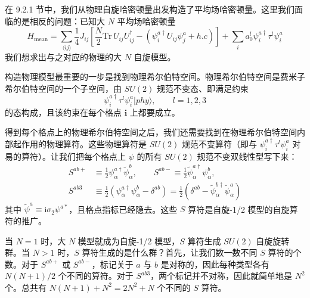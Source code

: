 在 9.2.1 节中，我们从物理自旋哈密顿量出发构造了平均场哈密顿量。这里我们面临的是相反的问题：已知大 $N$ 平均场哈密顿量
\begin{equation*}
H_{\text{mean}}=\sum_{\langle ij\rangle}\frac{1}{4}J_{ij}\left[\frac{N}{2}\mathrm{Tr}\,U_{ij}U_{ij}^{\dagger}-(\psi_i^{a\dagger}U_{ij}\psi_j^{a}+h.c)\right]+\sum_i a_0^l\psi_i^{a\dagger}\tau^{l}\psi_i^{a}
\tag{9.8.3}
\end{equation*}
我们想求出与之对应的物理的大 $N$ 自旋模型。

构造物理模型最重要的一步是找到物理希尔伯特空间。物理希尔伯特空间是费米子希尔伯特空间的一个子空间，由 $SU(2)$ 规范不变态、即满足约束
\begin{equation*}
\psi_i^{a\dagger}\tau^{l}\psi_i^{a}|phy\rangle,\qquad l=1,2,3
\end{equation*}
的态构成，且该约束在每个格点 $\pmb{i}$ 上都要成立。

得到每个格点上的物理希尔伯特空间之后，我们还需要找到在物理希尔伯特空间内部起作用的物理算符。这些物理算符是 $SU(2)$ 规范不变算符（即与 $\psi_i^{a\dagger}\tau^{l}\psi_i^{a}$ 对易的算符）。让我们把每个格点上 $\psi$ 的所有 $SU(2)$ 规范不变双线性型写下来：
\begin{equation*}
\begin{aligned}
S^{ab+}&\equiv\frac{1}{2}\psi_\alpha^{a\dagger}\tilde\psi_\alpha^{b},\qquad
S^{ab-}\equiv\frac{1}{2}\tilde\psi_\alpha^{a\dagger}\psi_\alpha^{b},\\
S^{ab3}&\equiv\frac{1}{2}\left(\psi_\alpha^{a\dagger}\psi_\alpha^{b}-\delta^{ab}\right)
=\frac{1}{2}\left(\delta^{ab}-\tilde\psi_\alpha^{b\dagger}\tilde\psi_\alpha^{a}\right)
\end{aligned}
\end{equation*}
其中 $\tilde\psi^{a}\equiv\mathrm{i}\sigma_2\psi^{a*}$，且格点指标已经隐去。这些 $S$ 算符是自旋-1/2 模型的自旋算符的推广。

当 $N=1$ 时，大 $N$ 模型就成为自旋-1/2 模型，$S$ 算符生成 $SU(2)$ 自旋旋转群。当 $N>1$ 时，$S$ 算符生成的是什么群？首先，让我们数一数不同 $S$ 算符的个数。对于 $S^{ab+}$ 或 $S^{ab-}$，标记关于 $a$ 与 $b$ 是对称的，因此每种类型各有 $N(N+1)/2$ 个不同的算符。对于 $S^{ab3}$，两个标记并不对称，因此就简单地是 $N^{2}$ 个。总共有 $N(N+1)+N^{2}=2N^{2}+N$ 个不同的 $S$ 算符。

